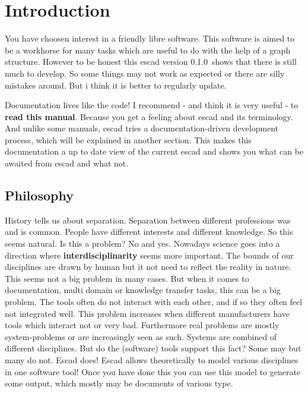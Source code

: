 \documentclass[a4paper, 12pt, openany]{scrbook}
\newcommand{\EscadVersion}{0.1.0}
\begin{document}
\tableofcontents

\chapter{Introduction}
You have choosen interest in a friendly libre software. This software is aimed to be a workhorse for many tasks which are useful to do with the help of a graph structure. However to be honest this escad version \EscadVersion\ shows that there is still much to develop. So some things may not work as expected or there are silly mistakes around. But i think it is better to regularly update.

Documentation lives like the code! I recommend - and think it is very useful - to \textbf{read this manual}. Because you get a feeling about escad and its terminology. And unlike some manuals, escad tries a documentation-driven development process, which will be explained in another section. This makes this documentation a up to date view of the current escad and shows you what can be awaited from escad and what not.
\section{Philosophy}
History tells us about separation. Separation between different professions was and is common. People have different interests and different knowledge. So this seems natural. Is this a problem? No and yes. Nowadays science goes into a direction where \textbf{interdisciplinarity} seems more important. The bounds of our disciplines are drawn by human but it not need to reflect the reality in nature. This seems not a big problem in many cases. But when it comes to documentation, multi domain or knowledge transfer tasks, this can be a big problem. The tools often do not interact with each other, and if so they often feel not integrated well. This problem increases when different manufacturers have tools which interact not or very bad. Furthermore real problems are mostly system-problems or are increasingly seen as such. Systems are combined of different disciplines. But do the (software) tools support this fact? Some may but many do not. Escad does! Escad allows theoretically to model various disciplines in one software tool! Once you have done this you can use this model to generate some output, which mostly may be documents of various type.
\end{document}
